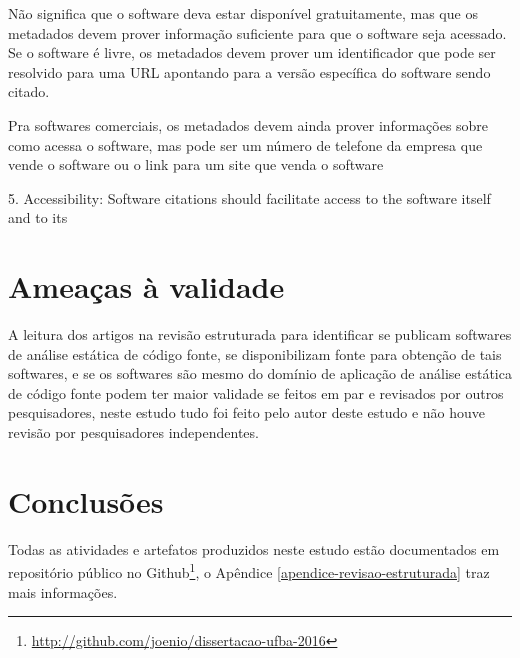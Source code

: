 Não significa que o software deva estar disponível gratuitamente, mas que
os metadados devem prover informação suficiente para que o software seja
acessado. Se o software é livre, os metadados devem prover um identificador
que pode ser resolvido para uma URL apontando para a versão específica
do software sendo citado.

Pra softwares comerciais, os metadados devem ainda prover informações sobre
como acessa o software, mas pode ser um número de telefone da empresa que
vende o software ou o link para um site que venda o software

\cite{smith2016software}

5. Accessibility: Software citations should facilitate access to the software itself and to its


\section{Ameaças à validade}

A leitura dos artigos na revisão estruturada para identificar se publicam
softwares de análise estática de código fonte, se disponibilizam fonte para
obtenção de tais softwares, e se os softwares são mesmo do domínio de aplicação
de análise estática de código fonte podem ter maior validade se feitos em
par e revisados por outros pesquisadores, neste estudo tudo foi feito pelo
autor deste estudo e não houve revisão por pesquisadores independentes.

\section{Conclusões}

Todas as atividades e artefatos produzidos neste estudo estão documentados em
repositório público no
Github\footnote{\url{http://github.com/joenio/dissertacao-ufba-2016}}, o
Apêndice \ref{apendice-revisao-estruturada} traz mais informações.



